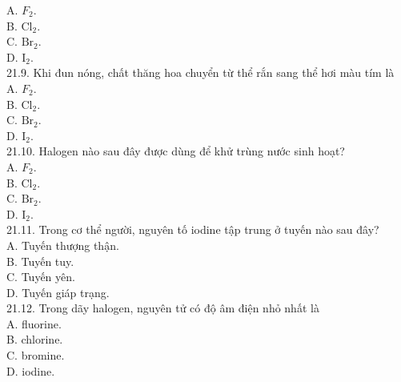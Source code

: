 \documentclass[10pt]{article}
\begin{document}
A. $F_{2}$.\\
B. $\mathrm{Cl}_{2}$.\\
C. $\mathrm{Br}_{2}$.\\
D. $\mathrm{I}_{2}$.\\
21.9. Khi đun nóng, chất thăng hoa chuyển từ thể rắn sang thể hơi màu tím là\\
A. $F_{2}$.\\
B. $\mathrm{Cl}_{2}$.\\
C. $\mathrm{Br}_{2}$.\\
D. $\mathrm{I}_{2}$.\\
21.10. Halogen nào sau đây được dùng để khử trùng nước sinh hoạt?\\
A. $F_{2}$.\\
B. $\mathrm{Cl}_{2}$.\\
C. $\mathrm{Br}_{2}$.\\
D. $\mathrm{I}_{2}$.\\
21.11. Trong cơ thể người, nguyên tố iodine tập trung ở tuyến nào sau đây?\\
A. Tuyến thượng thận.\\
B. Tuyến tuy.\\
C. Tuyến yên.\\
D. Tuyến giáp trạng.\\
21.12. Trong dãy halogen, nguyên tử có độ âm điện nhỏ nhất là\\
A. fluorine.\\
B. chlorine.\\
C. bromine.\\
D. iodine.
\end{document}
